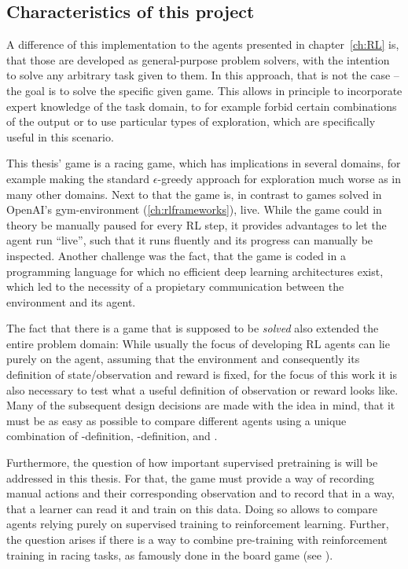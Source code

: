 \subsection{Characteristics of this project} \label{ch:projectcharacteristics}

A difference of this implementation to the agents presented in chapter~\ref{ch:RL} is, that those are developed as general-purpose problem solvers, with the intention to solve any arbitrary task given to them. In this approach, that is not the case -- the goal is to solve the specific given game. This allows in principle to incorporate expert knowledge of the task domain, to for example forbid certain combinations of the output or to use particular types of exploration, which are specifically useful in this scenario. 

This thesis' game is a racing game, which has implications in several domains, for example making the standard $\epsilon$-greedy approach for exploration much worse as in many other domains. Next to that the game is, in contrast to games solved in OpenAI's gym-environment (\ref{ch:rlframeworks}), live. While the game could in theory be manually paused for every RL step, it provides advantages to let the agent run ``live'', such that it runs fluently and its progress can manually be inspected. Another challenge was the fact, that the game is coded in a programming language for which no efficient deep learning architectures exist, which led to the necessity of a propietary communication between the environment and its agent.

The fact that there is a game that is supposed to be \textit{solved} also extended the entire problem domain: While usually the focus of developing RL agents can lie purely on the agent, assuming that the environment and consequently its definition of state/observation and reward is fixed, for the focus of this work it is also necessary to test what a useful definition of observation or reward looks like. Many of the subsequent design decisions are made with the idea in mind, that it must be as easy as possible to compare different agents using a unique combination of -definition, -definition,  and . 

Furthermore, the question of how important supervised pretraining is will be addressed in this thesis. For that, the game must provide a way of recording manual actions and their corresponding observation and to record that in a way, that a learner can read it and train on this data. Doing so allows to compare agents relying purely on supervised training to reinforcement learning. Further, the question arises if there is a way to combine pre-training with reinforcement training in racing tasks, as famously done in the board game  (see \cite{silver_mastering_2016}).

